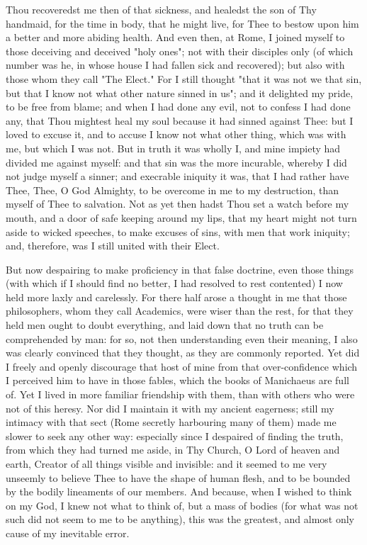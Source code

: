 \documentclass[b5paper,openright,12pt,twoside]{book}
\begin{document}
Thou recoveredst me then of that sickness, and healedst the son of Thy
handmaid, for the time in body, that he might live, for Thee to bestow
upon him a better and more abiding health. And even then, at Rome, I
joined myself to those deceiving and deceived "holy ones"; not with
their disciples only (of which number was he, in whose house I had
fallen sick and recovered); but also with those whom they call "The
Elect." For I still thought "that it was not we that sin, but that I
know not what other nature sinned in us"; and it delighted my pride, to
be free from blame; and when I had done any evil, not to confess I had
done any, that Thou mightest heal my soul because it had sinned against
Thee: but I loved to excuse it, and to accuse I know not what other
thing, which was with me, but which I was not. But in truth it was
wholly I, and mine impiety had divided me against myself: and that sin
was the more incurable, whereby I did not judge myself a sinner; and
execrable iniquity it was, that I had rather have Thee, Thee, O God
Almighty, to be overcome in me to my destruction, than myself of Thee to
salvation. Not as yet then hadst Thou set a watch before my mouth, and a
door of safe keeping around my lips, that my heart might not turn
aside to wicked speeches, to make excuses of sins, with men that work
iniquity; and, therefore, was I still united with their Elect.

But now despairing to make proficiency in that false doctrine, even
those things (with which if I should find no better, I had resolved to
rest contented) I now held more laxly and carelessly. For there half
arose a thought in me that those philosophers, whom they call Academics,
were wiser than the rest, for that they held men ought to doubt
everything, and laid down that no truth can be comprehended by man:
for so, not then understanding even their meaning, I also was clearly
convinced that they thought, as they are commonly reported. Yet did I
freely and openly discourage that host of mine from that over-confidence
which I perceived him to have in those fables, which the books of
Manichaeus are full of. Yet I lived in more familiar friendship with
them, than with others who were not of this heresy. Nor did I maintain
it with my ancient eagerness; still my intimacy with that sect (Rome
secretly harbouring many of them) made me slower to seek any other way:
especially since I despaired of finding the truth, from which they had
turned me aside, in Thy Church, O Lord of heaven and earth, Creator of
all things visible and invisible: and it seemed to me very unseemly to
believe Thee to have the shape of human flesh, and to be bounded by the
bodily lineaments of our members. And because, when I wished to think on
my God, I knew not what to think of, but a mass of bodies (for what was
not such did not seem to me to be anything), this was the greatest, and
almost only cause of my inevitable error.
\end{document}
